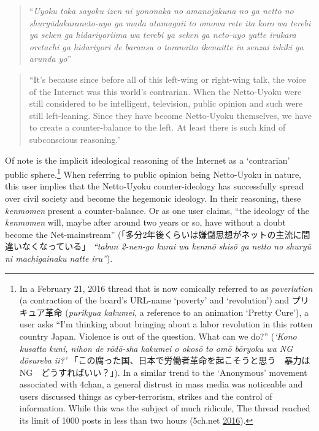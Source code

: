 \documentclass[10pt,british,A4paper,oneside]{memoir}
\begin{document}
\begin{quote}
``\emph{Uyoku toka sayoku izen ni yononaka no amanojakuna no ga netto no
shuryūdakara\newline neto-uyo ga mada atamagaii to omowa rete ita koro
wa terebi ya seken ga hidariyori\newline ima wa terebi ya seken ga
neto-uyo yatte irukara oretachi ga hidariyori de baransu o toranaito
ikenai\newline tte iu senzai ishiki ga arunda yo}''
\end{quote}

\begin{quote}
``It's because since before all of this left-wing or right-wing talk,
the voice of the Internet was this world's contrarian. When the
Netto-Uyoku were still considered to be intelligent, television, public
opinion and such were still left-leaning. Since they have become
Netto-Uyoku themselves, we have to create a counter-balance to the left.
At least there is such kind of subconscious reasoning.''
\end{quote}

Of note is the implicit ideological reasoning of the Internet as a
`contrarian' public sphere.\footnote{In a February 21, 2016 thread
  that is now comically referred to as \emph{poverlution} (a contraction
  of the board's URL-name `poverty' and `revolution') and プリキュア革命
  (\emph{purikyua kakumei}, a reference to an animation `Pretty Cure'),
  a user asks ``I'm thinking about bringing about a labor revolution in
  this rotten country Japan. Violence is out of the question. What can
  we do?'' (\emph{`Kono kusatta kuni, nihon de rōdō-sha kakumei o okosō
  to omō bōryoku wa NG dōsureba ii?'}
  「この腐った国、日本で労働者革命を起こそうと思う　暴力はNG　どうすればいい？」).
  In a similar trend to the `Anonymous' movement associated with 4chan,
  a general distrust in mass media was noticeable and users discussed
  things as cyber-terrorism, strikes and the control of information.
  While this was the subject of much ridicule, The thread reached its
  limit of 1000 posts in less than two hours (5ch.net
  \protect\hyperlink{ref-5ch.net_eng._2016}{2016}).} When
referring to public opinion being Netto-Uyoku in nature, this user implies that
the Netto-Uyoku counter-ideology has successfully spread over civil
society and become the hegemonic ideology. In their reasoning, these
\emph{kenmomen} present a counter-balance. Or as one user claims, ``the ideology
of the \emph{kenmomen} will, maybe after around two years or so, have
without a doubt become the Net-mainstream''
(「多分2年後くらいは嫌儲思想がネットの主流に間違いなくなっている」
\emph{``tabun 2-nen-go kurai wa kenmō shisō ga netto no shuryū ni
machigainaku natte iru''}).
\end{document}

